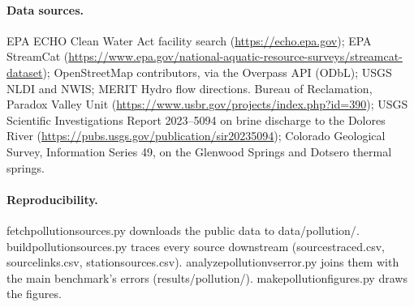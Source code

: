 \documentclass[11pt]{article}
\newcommand{\codeus}{\textunderscore\allowbreak}
\newcommand{\code}[1]{{\ttfamily\let\_\codeus #1}}
\begin{document}
\paragraph{Data sources.} EPA ECHO Clean Water Act facility search
(\url{https://echo.epa.gov}); EPA StreamCat (\url{https://www.epa.gov/national-aquatic-resource-surveys/streamcat-dataset});
OpenStreetMap contributors, via the Overpass API (ODbL); USGS NLDI and NWIS; MERIT Hydro flow
directions. Bureau of Reclamation, Paradox Valley Unit
(\url{https://www.usbr.gov/projects/index.php?id=390}); USGS Scientific Investigations Report
2023--5094 on brine discharge to the Dolores River (\url{https://pubs.usgs.gov/publication/sir20235094});
Colorado Geological Survey, Information Series 49, on the Glenwood Springs and Dotsero thermal
springs.

\paragraph{Reproducibility.} \code{fetch\_pollution\_sources.py} downloads the public data to
\code{data/pollution/}. \code{build\_pollution\_sources.py} traces every source downstream
(\code{sources\_traced.csv}, \code{source\_links.csv}, \code{station\_sources.csv}).
\code{analyze\_pollution\_vs\_error.py} joins them with the main benchmark's errors
(\code{results/pollution/}). \code{make\_pollution\_figures.py} draws the figures.
\end{document}
